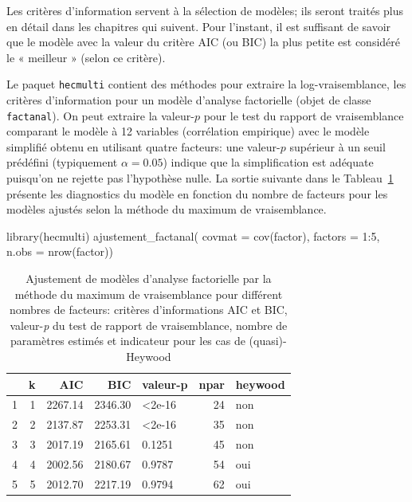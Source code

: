 \documentclass[
  11pt,
  letterpaper,
]{scrbook}
\newenvironment{Shaded}{\begin{snugshade}}{\end{snugshade}}
\newcommand{\AttributeTok}[1]{\textcolor[rgb]{0.40,0.45,0.13}{#1}}
\newcommand{\DecValTok}[1]{\textcolor[rgb]{0.68,0.00,0.00}{#1}}
\newcommand{\FunctionTok}[1]{\textcolor[rgb]{0.28,0.35,0.67}{#1}}
\newcommand{\NormalTok}[1]{\textcolor[rgb]{0.00,0.23,0.31}{#1}}
\newcommand{\SpecialCharTok}[1]{\textcolor[rgb]{0.37,0.37,0.37}{#1}}
\theoremstyle{definition}
\theoremstyle{remark}
\begin{document}
Les critères d'information servent à la sélection de modèles; ils seront
traités plus en détail dans les chapitres qui suivent. Pour l'instant,
il est suffisant de savoir que le modèle avec la valeur du critère AIC
(ou BIC) la plus petite est considéré le « meilleur » (selon ce
critère).

Le paquet \texttt{hecmulti} contient des méthodes pour extraire la
log-vraisemblance, les critères d'information pour un modèle d'analyse
factorielle (objet de classe \texttt{factanal}). On peut extraire la
valeur-\(p\) pour le test du rapport de vraisemblance comparant le
modèle à 12 variables (corrélation empirique) avec le modèle simplifié
obtenu en utilisant quatre facteurs: une valeur-\(p\) supérieur à un
seuil prédéfini (typiquement \(\alpha=0.05\)) indique que la
simplification est adéquate puisqu'on ne rejette pas l'hypothèse nulle.
La sortie suivante dans le Tableau~\ref{tbl-emvcrit} présente les
diagnostics du modèle en fonction du nombre de facteurs pour les modèles
ajustés selon la méthode du maximum de vraisemblance.

\begin{Shaded}
\begin{Highlighting}[]
\FunctionTok{library}\NormalTok{(hecmulti)}
\FunctionTok{ajustement\_factanal}\NormalTok{(}
    \AttributeTok{covmat =} \FunctionTok{cov}\NormalTok{(factor),}
    \AttributeTok{factors =} \DecValTok{1}\SpecialCharTok{:}\DecValTok{5}\NormalTok{,}
    \AttributeTok{n.obs =} \FunctionTok{nrow}\NormalTok{(factor))}
\end{Highlighting}
\end{Shaded}

\begin{longtable}[t]{lrrrlrl}

\caption{\label{tbl-emvcrit}Ajustement de modèles d'analyse factorielle
par la méthode du maximum de vraisemblance pour différent nombres de
facteurs: critères d'informations AIC et BIC, valeur-\emph{p} du test de
rapport de vraisemblance, nombre de paramètres estimés et indicateur
pour les cas de (quasi)-Heywood}

\tabularnewline

\toprule
 & k & AIC & BIC & valeur-p & npar & heywood\\
\midrule
1 & 1 & 2267.14 & 2346.30 & <2e-16 & 24 & non\\
2 & 2 & 2137.87 & 2253.31 & <2e-16 & 35 & non\\
3 & 3 & 2017.19 & 2165.61 & 0.1251 & 45 & non\\
4 & 4 & 2002.56 & 2180.67 & 0.9787 & 54 & oui\\
5 & 5 & 2012.70 & 2217.19 & 0.9794 & 62 & oui\\
\bottomrule

\end{longtable}
\end{document}
